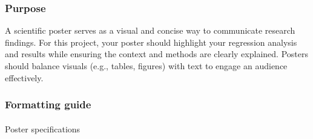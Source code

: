 \documentclass[
  letterpaper,
  DIV=11,
  numbers=noendperiod]{scrartcl}
\makeatletter
\let\oldparagraph\paragraph
\renewcommand{\paragraph}{
    \@ifstar
      \xxxParagraphStar
      \xxxParagraphNoStar
  }
\newcommand{\xxxParagraphStar}[1]{\oldparagraph*{#1}\mbox{}}
\newcommand{\xxxParagraphNoStar}[1]{\oldparagraph{#1}\mbox{}}
\makeatother
\begin{document}
\subsubsection{Purpose}\label{purpose}

A scientific poster serves as a visual and concise way to communicate
research findings. For this project, your poster should highlight your
regression analysis and results while ensuring the context and methods
are clearly explained. Posters should balance visuals (e.g., tables,
figures) with text to engage an audience effectively.

\subsubsection{Formatting guide}\label{formatting-guide}

\paragraph{Poster specifications}\label{poster-specifications}
\end{document}
